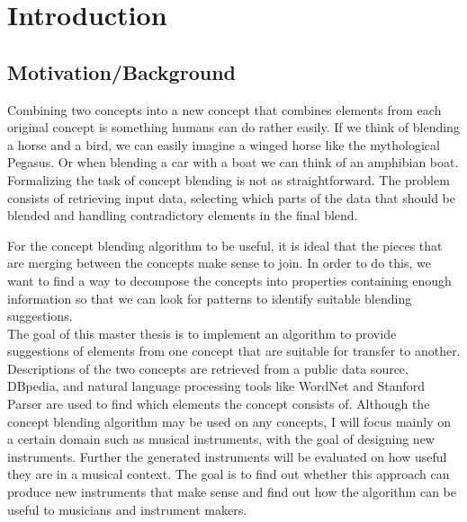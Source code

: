 
\chapter{Introduction} %

\label{Chapter1} %


\newcommand{\keyword}[1]{\textbf{#1}}
\newcommand{\tabhead}[1]{\textbf{#1}}
\newcommand{\code}[1]{\texttt{#1}}
\newcommand{\file}[1]{\texttt{\bfseries#1}}
\newcommand{\option}[1]{\texttt{\itshape#1}}


\section{Motivation/Background}
Combining two concepts into a new concept that combines elements from each original concept is something humans can do rather easily. If we think of blending a horse and a bird, we can easily imagine a winged horse like the mythological Pegasus. Or when blending a car with a boat we can think of an amphibian boat. Formalizing the task of concept blending is not as straightforward. The problem consists of retrieving input data, selecting which parts of the data that should be blended and handling contradictory elements in the final blend.

For the concept blending algorithm to be useful, it is ideal that the pieces that are merging between the concepts make sense to join. In order to do this, we want to find a way to decompose the concepts into properties containing enough information so that we can look for patterns to identify suitable blending suggestions. %
\\The goal of this master thesis is to implement an algorithm to provide suggestions of elements from one concept that are suitable for transfer to another. Descriptions of the two concepts are retrieved from a public data source, DBpedia, and natural language processing tools like WordNet and Stanford Parser are used to find which elements the concept consists of. Although the concept blending algorithm may be used on any concepts, I will focus mainly on a certain domain such as musical instruments, with the goal of designing new instruments. Further the generated instruments will be evaluated on how useful they are in a musical context. The goal is to find out whether this approach can produce new instruments that make sense and find out how the algorithm can be useful to musicians and instrument makers.

